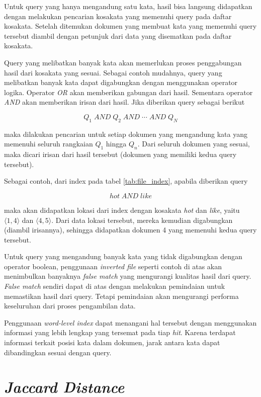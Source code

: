 Untuk query yang hanya mengandung satu kata, hasil bisa langsung didapatkan
dengan melakukan pencarian kosakata yang memenuhi query pada daftar kosakata.
Setelah ditemukan dokumen yang membuat kata yang memenuhi query tersebut diambil
dengan petunjuk dari data yang disematkan pada daftar kosakata.

Query yang melibatkan banyak kata akan memerlukan proses penggabungan hasil dari
kosakata yang sesuai. Sebagai contoh mudahnya, query yang melibatkan banyak kata
dapat digabungkan dengan menggunakan operator logika. Operator \textit{OR} akan
memberikan gabungan dari hasil. Sementara operator \textit{AND} akan memberikan
irisan dari hasil. Jika diberikan query sebagai berikut

\[
  Q_1 \;\textit{AND} \;Q_2 \;\textit{AND} \;\cdots{} \;\textit{AND} \;Q_N
\]

maka dilakukan pencarian untuk setiap dokumen yang mengandung kata yang memenuhi
seluruh rangkaian $Q_1$ hingga $Q_n$. Dari seluruh dokumen yang sesuai, maka
dicari irisan dari hasil tersebut (dokumen yang memiliki kedua query tersebut).

Sebagai contoh, dari index pada tabel \ref{tab:file_index}, apabila diberikan
query

\[
  hot\; \textit{AND} \;like
\]

maka akan didapatkan lokasi dari index dengan kosakata \textit{hot} dan
\textit{like}, yaitu $\langle{}1, 4 \rangle{}$ dan $\langle{}4, 5 \rangle{}$.
Dari data lokasi tersebut, mereka kemudian digabungkan (diambil irisannya),
sehingga didapatkan dokumen 4 yang memenuhi kedua query tersebut.

Untuk query yang mengandung banyak kata yang tidak digabungkan dengan operator
boolean, penggunaan \textit{inverted file} seperti contoh di atas akan
menimbulkan banyaknya \textit{false match} yang mengurangi kualitas hasil dari
query. \textit{False match} sendiri dapat di atas dengan melakukan pemindaian
untuk memastikan hasil dari query. Tetapi pemindaian akan mengurangi performa
keseluruhan dari proses pengambilan data.

Penggunaan \textit{word-level index} dapat menangani hal tersebut dengan
menggunakan informasi yang lebih lengkap yang tersemat pada tiap \textit{hit}.
Karena terdapat informasi terkait posisi kata dalam dokumen, jarak antara kata
dapat dibandingkan sesuai dengan query.

\section{\textit{Jaccard Distance}}

